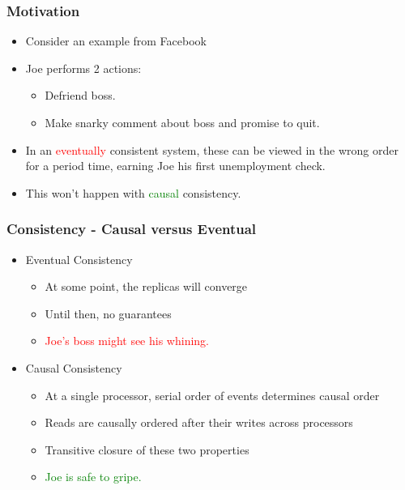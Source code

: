 \documentclass{beamer}
\begin{document}
\begin{frame}
\frametitle{Motivation}
\begin{itemize}

\item Consider an example from Facebook
\pause\item Joe performs 2 actions:
	\begin{itemize}
		\item Defriend boss.
		\item Make snarky comment about boss and promise to quit.
	\end{itemize}
\item In an \textcolor{red}{eventually} consistent system, these can be viewed in the wrong order for a period time, earning Joe his first unemployment check.
\item This won't happen with \textcolor{green}{causal} consistency.

\end{itemize}  
\end{frame}

\begin{frame}
\frametitle{Consistency - Causal versus Eventual}
\begin{itemize}
	\item Eventual Consistency
	\begin{itemize}
		\item At some point, the replicas will converge
		\item Until then, no guarantees
		\item \textcolor{red}{Joe's boss might see his whining.}	
	\end{itemize}

\pause \item Causal Consistency
	\begin{itemize}
		\item At a single processor, serial order of events determines causal order
		\item Reads are causally ordered after their writes across processors
		\item Transitive closure of these two properties
		\item \textcolor{green}{Joe is safe to gripe.}
	\end{itemize}

\end{itemize}  
\end{frame}
\end{document}

